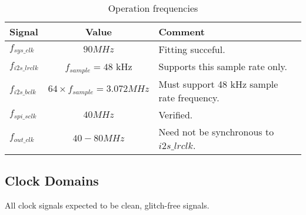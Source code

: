 \documentclass{rep}
\theoremstyle{plain}
\begin{document}
\begin{table}[H]
  \begin{center}
    \begin{tabular}{|l|c|l|}
      \hline

      \rowcolor{iob-green}
      \textbf{Signal}  & \textbf{Value} & \textbf{Comment}\\
      \hline
      \hline

      $f_{sys\_clk}$ & $ 90 MHz$ & Fitting succeful.\\
      \hline

      \rowcolor{iob-blue}
      $f_{i2s\_lrclk}$ & $f_{sample}=48$ kHz & Supports this sample rate only.\\
      \hline

      $f_{i2s\_bclk}$ & $64 \times f_{sample}=3.072 MHz$ & Must support 48 kHz sample rate frequency. \\
      \hline

      \rowcolor{iob-blue}
      $f_{spi\_sclk}$ & $40 MHz$ & Verified.\\
      \hline

      $f_{out\_clk}$ & $40-80 MHz$ & Need not be synchronous to  $i2s\_lrclk$.\\
      \hline
      
    \end{tabular}
    \caption{Operation frequencies}
    \label{tab:freq}
  \end{center}
\end{table}



\subsection{Clock Domains}
\label{sec:cdc}

All clock signals expected to be clean, glitch-free signals.
\end{document}
